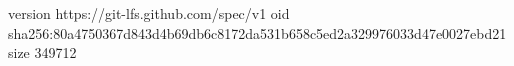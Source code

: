 version https://git-lfs.github.com/spec/v1
oid sha256:80a4750367d843d4b69db6c8172da531b658c5ed2a329976033d47e0027ebd21
size 349712
